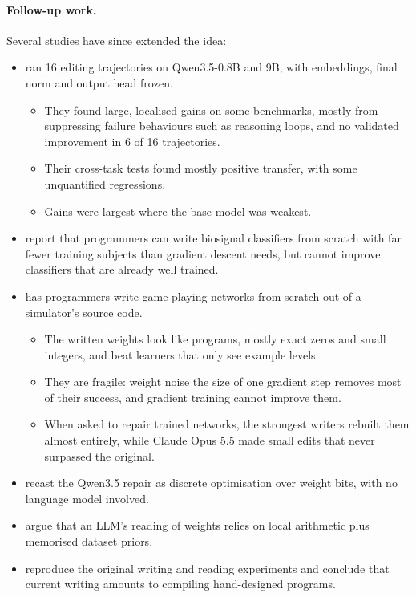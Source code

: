 \paragraph{Follow-up work.} Several studies have since extended the idea:
\begin{itemize}
  \item \citet{hu2026exploring} ran 16 editing trajectories on Qwen3.5-0.8B and 9B, with embeddings, final norm and output head frozen.
  \begin{itemize}
    \item They found large, localised gains on some benchmarks, mostly from suppressing failure behaviours such as reasoning loops, and no validated improvement in 6 of 16 trajectories.
    \item Their cross-task tests found mostly positive transfer, with some unquantified regressions.
    \item Gains were largest where the base model was weakest.
  \end{itemize}
  \item \citet{varam2026mixed} report that programmers can write biosignal classifiers from scratch with far fewer training subjects than gradient descent needs, but cannot improve classifiers that are already well trained.
  \item \citet{lehmann2026compiling} has programmers write game-playing networks from scratch out of a simulator's source code.
  \begin{itemize}
    \item The written weights look like programs, mostly exact zeros and small integers, and beat learners that only see example levels.
    \item They are fragile: weight noise the size of one gradient step removes most of their success, and gradient training cannot improve them.
    \item When asked to repair trained networks, the strongest writers rebuilt them almost entirely, while Claude Opus 5.5 made small edits that never surpassed the original.
  \end{itemize}
  \item \citet{salloum2026treeising} recast the Qwen3.5 repair as discrete optimisation over weight bits, with no language model involved.
  \item \citet{ahmed2026memorization} argue that an LLM's reading of weights relies on local arithmetic plus memorised dataset priors.
  \item \citet{goworek2026replicating} reproduce the original writing and reading experiments and conclude that current writing amounts to compiling hand-designed programs.
\end{itemize}
